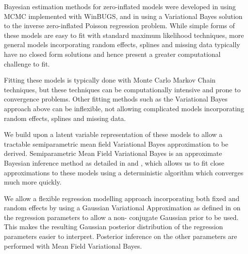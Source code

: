 Bayesian estimation methods for zero-inflated models were developed in
\cite{Ghosh2006} using MCMC implemented with WinBUGS, and in \cite{Vatsa2014}
using a Variational Bayes solution to the inverse zero-inflated Poisson
regression problem. While simple forms of these models are easy to fit with
standard  maximum likelihood techniques, more general models incorporating
random effects, splines and missing data  typically have no closed form
solutions and hence present a greater computational challenge to fit.

Fitting these models is typically done with Monte Carlo Markov Chain
techniques, but these techniques can be computationally intensive and prone to
convergence problems.  Other fitting methods such as the Variational Bayes
approach above can be inflexible, not allowing complicated models incorporating
random effects, splines and missing data.

We build upon a latent variable representation of these models to allow a
tractable semiparametric mean field Variational Bayes approximation to be
derived. Semiparametric Mean Field Variational Bayes is an approximate Bayesian
inference method as detailed in \cite{Ormerod2010} and \cite{Rohde2015}, which
allows us to fit close approximations to these models using a deterministic
algorithm which converges much more quickly.

We allow a flexible regression modelling approach incorporating both fixed and
random effects by using a Gaussian Variational Approximation as defined in
\cite{Ormerod2012} on the regression parameters to allow a non- conjugate
Gaussian prior to be used. This makes the resulting Gaussian posterior
distribution of the regression parameters easier to interpret. Posterior
inference on the other parameters are performed with Mean Field Variational
Bayes.

